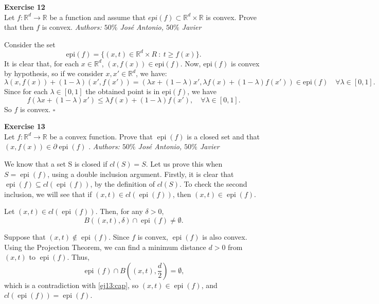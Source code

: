 \documentclass[11pt,table]{article}
\newcommand{\qed}{\hfill $\square$}
\newenvironment{problem}[2][Exercise]
{ \begin{mdframed}[backgroundcolor=gray!20] \textbf{#1 #2} \\}
	{\hspace{0.0cm}\newline\newline \emph{Authors: \(50\%\) José Antonio, \(50\%\) Javier}  \end{mdframed}}
\newcommand\R{\mathbb R}
\begin{document}
\begin{problem}{12}
Let \( f:\mathbb{R}^d \to \mathbb{R} \)  be a function and assume that \( epi(f) \subset \mathbb{R}^d \times \mathbb{R} \)  is convex. Prove that then \( f \)  is convex.
\end{problem}

Consider the set
\[
	\text{epi}(f) = \{(x,t)\in \R^d \times R \ : \ t \geq f(x)\}.
\]
It is clear that, for each \(x \in \R^d\), \((x,f(x))\in \text{epi}(f)\). Now, \(\text{epi}(f)\) is convex by hypothesis, so if we consider \(x,x'\in \R^d\), we have:
\[
	\lambda(x,f(x)) + (1-\lambda)(x',f(x')) = \left(\lambda x + (1-\lambda)x', \lambda f(x) + (1-\lambda)f(x')\right) \in \text{epi}(f)\quad \forall \lambda \in [0,1].
\]
Since for each \(\lambda \in [0,1]\) the obtained point is in \(\text{epi}(f)\), we have
\[
	f(\lambda x + (1-\lambda)x') \leq \lambda f(x) + (1-\lambda)f(x'), \quad \forall \lambda \in [0,1].
\]
So \(f\) is convex. \qed \\


\begin{problem}{13}
Let \( f : \mathbb{R}^d \to \mathbb{R} \) be a convex function. Prove that \( \operatorname{epi}(f) \) is a closed set and that \( (x, f(x)) \in \partial \operatorname{epi}(f) \)  .
\end{problem}

We know that a set S is closed if \(cl(S) = S\). Let us prove this when \(S = \operatorname{epi}(f)\), using a double inclusion argument. Firstly, it is clear that $\operatorname{epi}(f) \subseteq cl(\operatorname{epi}(f))$, by the definition of \(cl(S)\). To check the second inclusion, we will see that if \((x,t)\in cl(\operatorname{epi}(f))\), then \((x,t) \in \operatorname{epi}(f)\).

Let \((x,t)\in cl(\operatorname{epi}(f))\). Then, for any \(\delta > 0\),
\begin{equation}\label{ej13:cap}
	B((x,t),\delta) \cap 	\operatorname{epi}(f) \neq \emptyset.
\end{equation}

Suppose that \((x,t)\notin \operatorname{epi}(f)\). Since \(f\) is convex, \(\operatorname{epi}(f)\) is also convex. Using the Projection Theorem, we can find a minimum distance \(d > 0\) from \((x,t)\) to \(\operatorname{epi}(f)\). Thus,
\[
	\operatorname{epi}(f) \cap B((x,t), \frac{d}{2}) = \emptyset,
\]
which is a contradiction with \eqref{ej13:cap}, so \((x,t) \in \operatorname{epi}(f)\), and \(cl(\operatorname{epi}(f)) = \operatorname{epi}(f)\).
\end{document}
